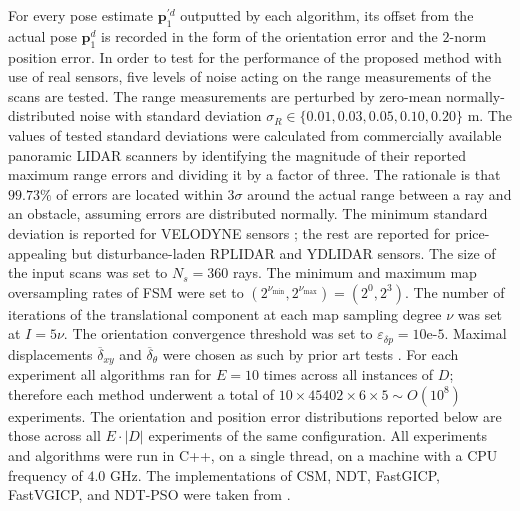 For every pose estimate $\bm{p}_1^{\prime d}$ outputted by each algorithm, its
offset from the actual pose $\bm{p}_1^d$ is recorded in the form of the
orientation error and the $2$-norm position error.
In order to test for the performance of the proposed method with use of real
sensors, five levels of noise acting on the range measurements of the scans are
tested. The range measurements are perturbed by zero-mean normally-distributed
noise with standard deviation $\sigma_R \in \{0.01, 0.03, 0.05, 0.10, 0.20\}$ m.
The values of tested standard deviations were calculated from
commercially available panoramic LIDAR scanners by identifying the magnitude of
their reported maximum range errors and dividing it by a factor of three. The
rationale is that $99.73\%$ of errors are located within $3\sigma$ around the
actual range between a ray and an obstacle, assuming errors are distributed
normally. The minimum standard deviation is reported for
VELODYNE sensors \cite{velodyne_datasheet}; the rest are reported for
price-appealing but disturbance-laden RPLIDAR \cite{a2m8_datasheet} and YDLIDAR
\cite{ydlidar_datasheets} sensors. The size of the input scans was set
to $N_s=360$ rays. The minimum and maximum map oversampling rates of FSM were
set to $(2^{\nu_{\min}},2^{\nu_{\max}}) = (2^0,2^3)$.  The number of iterations
of the translational component at each map sampling degree $\nu$ was set at $I
= 5\nu$. The orientation convergence threshold was set to $\varepsilon_{\delta
p} = 10$e-$5$. Maximal displacements $\overline{\delta}_{xy}$ and
$\overline{\delta}_\theta$ were chosen as such by prior art tests \cite{plicp}.
For each experiment all algorithms ran for $E = 10$ times across all instances
of $D$; therefore each method underwent a total of $10 \times 45402 \times 6
\times 5 \sim O(10^8)$ experiments. The orientation and position error
distributions reported below are those across all $E \cdot |D|$ experiments of
the same configuration.  All experiments and algorithms were run in C++, on a
single thread, on a machine with a CPU frequency of $4.0$ GHz. The
implementations of CSM, NDT, FastGICP, FastVGICP, and NDT-PSO were taken from
\cite{implementations}.

